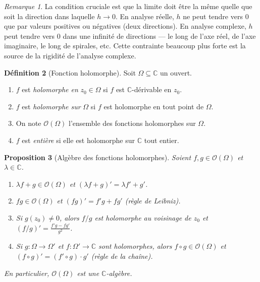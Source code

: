 \documentclass[12pt,a4paper,openany]{book}
\theoremstyle{definition}
\newtheorem{definition}{Définition}[chapter]
\theoremstyle{plain}
\newtheorem{proposition}[definition]{Proposition}
\theoremstyle{remark}
\newtheorem{remarque}[definition]{Remarque}
\newcommand{\C}{\mathbb{C}}
\begin{document}
\begin{remarque}\label{rem:derivee-directionnelle}
La condition cruciale est que la limite doit être la même quelle que soit la direction dans laquelle $h \to 0$. En analyse réelle, $h$ ne peut tendre vers $0$ que par valeurs positives ou négatives (deux directions). En analyse complexe, $h$ peut tendre vers $0$ dans une infinité de directions --- le long de l'axe réel, de l'axe imaginaire, le long de spirales, etc. Cette contrainte beaucoup plus forte est la source de la rigidité de l'analyse complexe.
\end{remarque}

\begin{definition}[Fonction holomorphe]\label{def:holomorphe}
Soit $\Omega \subseteq \C$ un ouvert.
\begin{enumerate}[label=(\roman*)]
  \item $f$ est \emph{holomorphe en} $z_0 \in \Omega$ si $f$ est $\C$-dérivable en $z_0$.
  \item $f$ est \emph{holomorphe sur} $\Omega$ si $f$ est holomorphe en tout point de $\Omega$.
  \item On note $\mathscr{O}(\Omega)$ l'ensemble des fonctions holomorphes sur $\Omega$.
  \item $f$ est \emph{entière} si elle est holomorphe sur $\C$ tout entier.
\end{enumerate}
\end{definition}

\begin{proposition}[Algèbre des fonctions holomorphes]\label{prop:algebre-holomorphe}
Soient $f, g \in \mathscr{O}(\Omega)$ et $\lambda \in \C$.
\begin{enumerate}[label=(\roman*)]
  \item $\lambda f + g \in \mathscr{O}(\Omega)$ et $(\lambda f + g)' = \lambda f' + g'$.
  \item $fg \in \mathscr{O}(\Omega)$ et $(fg)' = f'g + fg'$ \quad (règle de Leibniz).
  \item Si $g(z_0) \neq 0$, alors $f/g$ est holomorphe au voisinage de $z_0$ et $(f/g)' = \frac{f'g - fg'}{g^2}$.
  \item Si $g : \Omega \to \Omega'$ et $f : \Omega' \to \C$ sont holomorphes, alors $f \circ g \in \mathscr{O}(\Omega)$ et $(f \circ g)' = (f' \circ g) \cdot g'$ \quad (règle de la chaîne).
\end{enumerate}
En particulier, $\mathscr{O}(\Omega)$ est une $\C$-algèbre.
\end{proposition}
\end{document}
